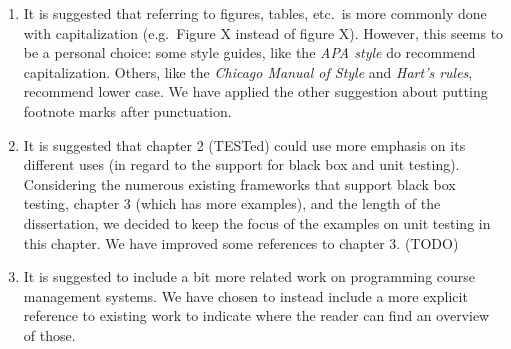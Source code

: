 \documentclass[
    paper=a4,
    paper=portrait,
    parskip=half,
]{scrartcl}
\begin{document}
\begin{enumerate}
    \item It is suggested that referring to figures, tables, etc.\ is more commonly done with capitalization (e.g.\ Figure X instead of figure X).
        However, this seems to be a personal choice: some style guides, like the \textit{APA style} do recommend capitalization.
        Others, like the \textit{Chicago Manual of Style} and \textit{Hart's rules}, recommend lower case.
        We have applied the other suggestion about putting footnote marks after punctuation.
    \item It is suggested that chapter 2 (TESTed) could use more emphasis on its different uses (in regard to the support for black box and unit testing).
        Considering the numerous existing frameworks that support black box testing, chapter 3 (which has more examples), and the length of the dissertation, we decided to keep the focus of the examples on unit testing in this chapter.
        We have improved some references to chapter 3. (TODO)
    \item It is suggested to include a bit more related work on programming course management systems.
        We have chosen to instead include a more explicit reference to existing work to indicate where the reader can find an overview of those.
\end{enumerate}
\end{document}
